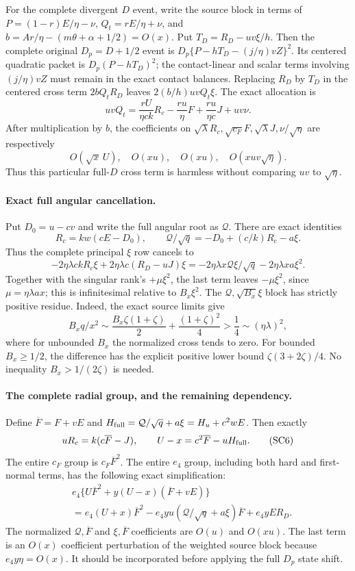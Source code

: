 For the complete divergent $D$ event, write the source block in
terms of $P=(1-r)E/\eta-\nu$, $Q_t=rE/\eta+\nu$, and
$b=Ar/\eta-(m\theta+\alpha+1/2)=O(x)$. Put
$T_D=R_D-uv\xi/h$. Then the complete original $D_p=D+1/2$ event is
$D_p\{P-hT_D-(j/\eta)vZ\}^2$. Its centered quadratic packet is
$D_p(P-hT_D)^2$; the contact-linear and scalar terms involving
$(j/\eta)vZ$ must remain in the exact contact balances. Replacing
$R_D$ by $T_D$ in the centered cross term $2bQ_tR_D$ leaves $2(b/h)uvQ_t\xi$. The exact
allocation is
\[
 uvQ_t=\frac{rU}{\eta ck}R_c-\frac{ru}{\eta}F
                    +\frac{ru}{\eta c}J+uv\nu.       \tag{SC4}
\]
After multiplication by $b$, the coefficients on
$\sqrt\lambda R_c,\sqrt{c_F}F,\sqrt\lambda J,\nu/\sqrt\eta$
are respectively
\[
 O(\sqrt x\,U),\quad O(xu),\quad O(xu),\quad O(xuv\sqrt\eta).
\]
Thus this particular full-$D$ cross term is harmless without comparing
$uv$ to $\sqrt\eta$.

\paragraph{Exact full angular cancellation.}
Put $D_0=u-cv$ and write the full angular root as $\mathcal Q$.
There are exact identities
\[
 R_c=kw(cE-D_0),\qquad
 \mathcal Q/\sqrt q=-D_0+(c/k)R_c-a\xi.
\]
Thus the complete principal $\xi$ row cancels to
\[
 -2\eta\lambda ckR_c\xi+2\eta\lambda c(R_D-uJ)\xi
 =-2\eta\lambda x\mathcal Q\xi/\sqrt q
                     -2\eta\lambda xa\xi^2.          \tag{SC5}
\]
Together with the singular rank's $+\mu\xi^2$, the last term leaves
$-\mu\xi^2$, since $\mu=\eta\lambda ax$; this is infinitesimal
relative to $B_x\xi^2$. The $\mathcal Q,\sqrt{B_x}\xi$ block
has strictly positive residue. Indeed, the exact source limits give
\[
 B_xq/x^2\sim
 \frac{B_x\zeta(1+\zeta)}2+\frac{(1+\zeta)^2}4
 >\frac14\sim(\eta\lambda)^2,
\]
where for unbounded $B_x$ the normalized cross tends to zero. For
bounded $B_x\ge1/2$, the difference has the explicit positive lower
bound $\zeta(3+2\zeta)/4$. No inequality
$B_x>1/(2\zeta)$ is needed.

\paragraph{The complete radial group, and the remaining dependency.}
Define $\overline F=F+vE$ and
$H_{\rm full}=\mathcal Q/\sqrt q+a\xi=H_u+c^2wE$.
Then exactly
\[
 uR_c=k(c\overline F-J),\qquad
 U-x=c^2\overline F-uH_{\rm full}.                    \tag{SC6}
\]
The entire $c_F$ group is $c_F\overline F^2$. The entire
$e_4$ group, including both hard and first-normal terms, has the
following exact simplification:
\[
\begin{split}
 &e_4\{U\overline F^2+y(U-x)(\overline F+vE)\}\\
 &=e_4(U+x)\overline F^2
   -e_4yu(\mathcal Q/\sqrt q+a\xi)\overline F
   +e_4yER_D.
\end{split}                                             \tag{SC7}
\]
The normalized $\mathcal Q,\overline F$ and
$\xi,\overline F$ coefficients are $O(u)$ and $O(xu)$.
The last term is an $O(x)$ coefficient perturbation of the weighted
source block because $e_4y\eta=O(x)$. It should be incorporated
before applying the full $D_p$ state shift.

